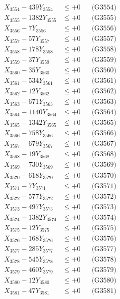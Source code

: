 \documentclass[a4paper,10pt]{article}
\begin{document}
{\begin{align}
X_{3554} - 439Y_{3554} &\leq +0 && \text{(G3554)} \\
X_{3555} - 1382Y_{3555} &\leq +0 && \text{(G3555)} \\
X_{3556} - 7Y_{3556} &\leq +0 && \text{(G3556)} \\
X_{3557} - 57Y_{3557} &\leq +0 && \text{(G3557)} \\
X_{3558} - 178Y_{3558} &\leq +0 && \text{(G3558)} \\
X_{3559} - 37Y_{3559} &\leq +0 && \text{(G3559)} \\
X_{3560} - 35Y_{3560} &\leq +0 && \text{(G3560)} \\
\allowbreak
X_{3561} - 534Y_{3561} &\leq +0 && \text{(G3561)} \\
X_{3562} - 12Y_{3562} &\leq +0 && \text{(G3562)} \\
X_{3563} - 671Y_{3563} &\leq +0 && \text{(G3563)} \\
X_{3564} - 1140Y_{3564} &\leq +0 && \text{(G3564)} \\
X_{3565} - 1342Y_{3565} &\leq +0 && \text{(G3565)} \\
X_{3566} - 758Y_{3566} &\leq +0 && \text{(G3566)} \\
X_{3567} - 679Y_{3567} &\leq +0 && \text{(G3567)} \\
X_{3568} - 19Y_{3568} &\leq +0 && \text{(G3568)} \\
X_{3569} - 730Y_{3569} &\leq +0 && \text{(G3569)} \\
X_{3570} - 618Y_{3570} &\leq +0 && \text{(G3570)} \\
\allowbreak
X_{3571} - 7Y_{3571} &\leq +0 && \text{(G3571)} \\
X_{3572} - 577Y_{3572} &\leq +0 && \text{(G3572)} \\
X_{3573} - 497Y_{3573} &\leq +0 && \text{(G3573)} \\
X_{3574} - 1382Y_{3574} &\leq +0 && \text{(G3574)} \\
X_{3575} - 12Y_{3575} &\leq +0 && \text{(G3575)} \\
X_{3576} - 168Y_{3576} &\leq +0 && \text{(G3576)} \\
X_{3577} - 285Y_{3577} &\leq +0 && \text{(G3577)} \\
X_{3578} - 545Y_{3578} &\leq +0 && \text{(G3578)} \\
X_{3579} - 460Y_{3579} &\leq +0 && \text{(G3579)} \\
X_{3580} - 12Y_{3580} &\leq +0 && \text{(G3580)} \\
\allowbreak
X_{3581} - 47Y_{3581} &\leq +0 && \text{(G3581)} \\

\end{align}}
\end{document}
